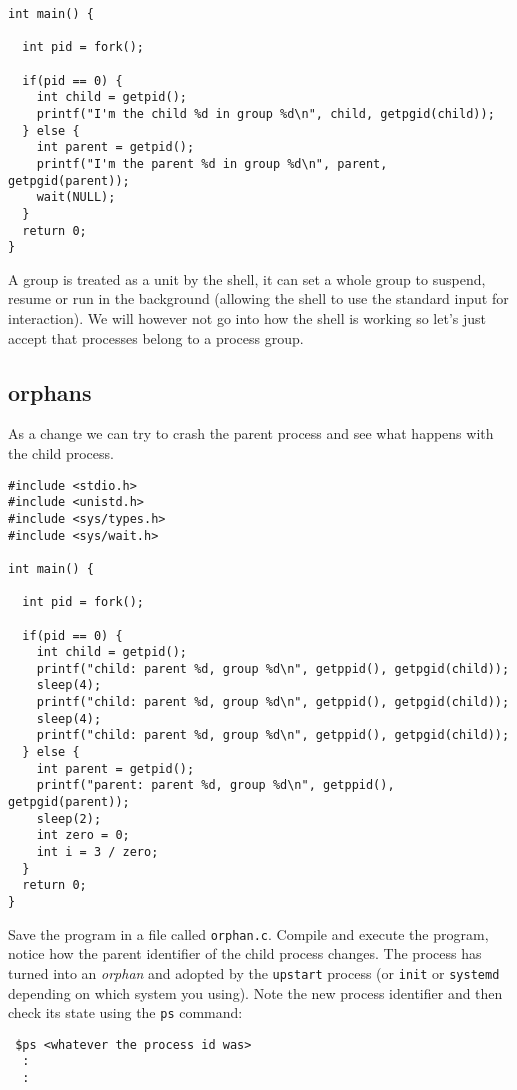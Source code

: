 \documentclass[a4paper,11pt]{article}
\begin{document}
\begin{lstlisting}
int main() {

  int pid = fork();

  if(pid == 0) {
    int child = getpid();
    printf("I'm the child %d in group %d\n", child, getpgid(child));
  } else {
    int parent = getpid();    
    printf("I'm the parent %d in group %d\n", parent, getpgid(parent));
    wait(NULL);
  }
  return 0;
}
\end{lstlisting}

A group is treated as a unit by the shell, it can set a whole group to
suspend, resume or run in the background (allowing the shell to use
the standard input for interaction). We will however not go into how
the shell is working so let's just accept that processes belong to a
process group.


\subsection{orphans}

As a change we can try to crash the parent process and see
what happens with the child process. 

\begin{lstlisting}
#include <stdio.h>
#include <unistd.h>
#include <sys/types.h>
#include <sys/wait.h>

int main() {

  int pid = fork();

  if(pid == 0) {
    int child = getpid();
    printf("child: parent %d, group %d\n", getppid(), getpgid(child));
    sleep(4);
    printf("child: parent %d, group %d\n", getppid(), getpgid(child));
    sleep(4);
    printf("child: parent %d, group %d\n", getppid(), getpgid(child));    
  } else {
    int parent = getpid();
    printf("parent: parent %d, group %d\n", getppid(), getpgid(parent));    
    sleep(2);
    int zero = 0;
    int i = 3 / zero;
  }
  return 0;
}
\end{lstlisting}

Save the program in a file called {\tt orphan.c}. Compile and execute
the program, notice how the parent identifier of the child process
changes. The process has turned into an {\em orphan} and adopted by the
{\tt upstart} process (or {\tt init} or {\tt systemd} depending on
which system you using).  Note the new process identifier and then
check its state using the {\tt ps} command:

\begin{verbatim}
 $ps <whatever the process id was>
  :
  :
\end{verbatim}
\end{document}
